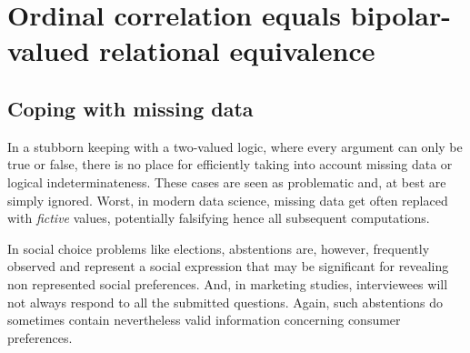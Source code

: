 \chapter{Ordinal correlation equals bipolar-valued relational equivalence}
\label{sec:16}

\abstract*{}

\abstract{}

\section{Coping with missing data}
\label{sec:16.1}

In a stubborn keeping with a two-valued logic, where every argument can only be true or false, there is no place for efficiently taking into account missing data or logical indeterminateness. These cases are seen as problematic and, at best are simply ignored. Worst, in modern data science, missing data get often replaced with \emph{fictive} values, potentially falsifying hence all subsequent computations.

In social choice problems like elections, abstentions are, however, frequently observed and represent a social expression that may be significant for revealing non represented social preferences. And, in marketing studies, interviewees will not always respond to all the submitted questions. Again, such abstentions do sometimes contain nevertheless valid information concerning consumer preferences.

